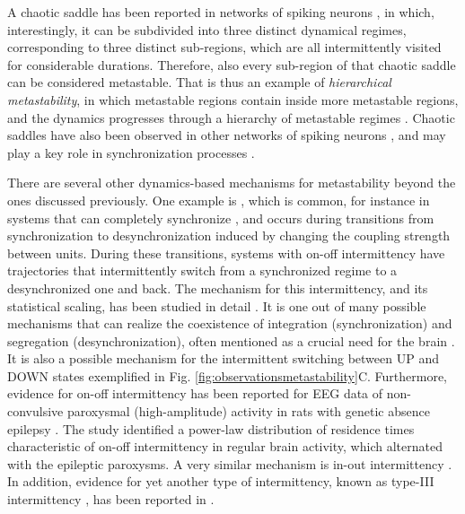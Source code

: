 A chaotic saddle has been reported in networks of spiking neurons \cite{ansmann2016selfinduced}, in which, interestingly, it can be subdivided into three distinct dynamical regimes, corresponding to three distinct sub-regions, which are all intermittently visited for considerable durations. Therefore, also every sub-region of that chaotic saddle can be considered metastable. That is thus an example of \textit{hierarchical metastability}, in which metastable regions contain inside more metastable regions, and the dynamics progresses through a hierarchy of metastable regimes \cite{cavanna2018dynamic}. Chaotic saddles have also been observed in other networks of spiking neurons \cite{keplinger2014transient, lafranceschina2015impact, hartle2017transient, kaminker2019alternating}, and may play a key role in synchronization processes \cite{medeiros2018boundaries, medeiros2019state}.

There are several other dynamics-based mechanisms for metastability beyond the ones discussed previously. One example is , which is common, for instance in systems that can completely synchronize \cite{ashwin1994bubbling, ott1994blowout}, and occurs during transitions from synchronization to desynchronization induced by changing the coupling strength between units. During these transitions, systems with on-off intermittency have trajectories that intermittently switch from a synchronized regime to a desynchronized one and back. The mechanism for this intermittency, and its statistical scaling, has been studied in detail \cite{ platt1993onoff, heagy1994characterization, hammer1994experimental, cenis1997symmetry}. It is one out of many possible mechanisms that can realize the coexistence of integration (synchronization) and segregation (desynchronization), often mentioned as a crucial need for the brain \cite{fingelkurts2001operational, tognoli2014metastable, tognoli2014enlarging, deco2015rethinking}. It is also a possible mechanism for the intermittent switching between UP and DOWN states exemplified in Fig. \ref{fig:observationsmetastability}C. Furthermore, evidence for on-off intermittency has been reported for EEG data of non-convulsive paroxysmal (high-amplitude) activity in rats with genetic absence epilepsy \cite{hramov2006onoff}. The study identified a power-law distribution of residence times characteristic of on-off intermittency in regular brain activity, which alternated with the epileptic paroxysms.
A very similar mechanism is in-out intermittency \cite{ashwin1999transverse, ashwin2001influence,saha2018characteristics, saha2017extreme}. In addition, evidence for yet another type of intermittency, known as type-III intermittency \cite{pomeau1979intermittency}, has been reported in \cite{velazquez1999type}.

